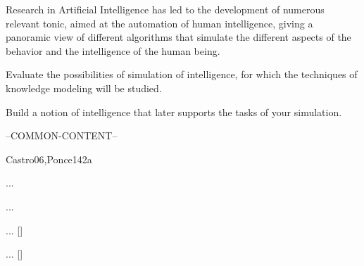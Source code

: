 \begin{syllabus}

	
	\begin{justification}
	Research in Artificial Intelligence has led to the development of numerous relevant tonic, aimed at the automation of human intelligence, giving a panoramic view of different
	algorithms that simulate the different aspects of the behavior and the intelligence of the human being.
	\end{justification}
	
	\begin{goals}
	\item Evaluate the possibilities of simulation of intelligence, for which the techniques of knowledge modeling will be studied.
	\item Build a notion of intelligence that later supports the tasks of your simulation.
	\end{goals}
	
	--COMMON-CONTENT--
	
	\begin{unit}{\ISFundamentalIssues}{}{Castro06,Ponce14}{2}{a}
			\begin{topics}
					\item ...
					\item ...
			\end{topics}
			\begin{learningoutcomes}
					\item ... [\Usage]
					\item ... [\Usage]
			\end{learningoutcomes}
	\end{unit}
	
	
	\begin{coursebibliography}
	\end{coursebibliography}
	
	\end{syllabus}
	